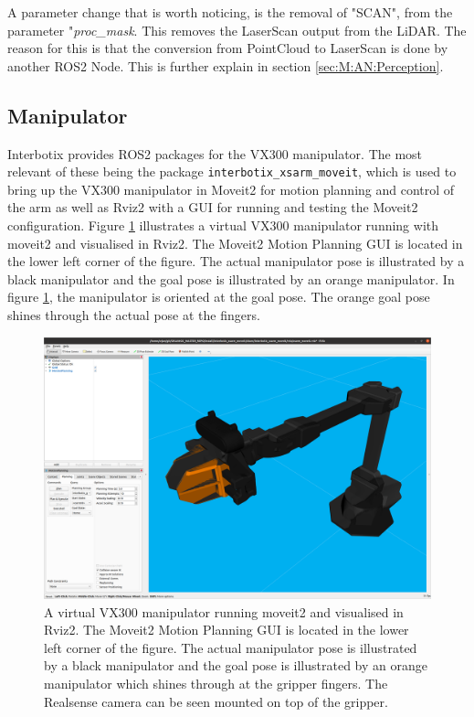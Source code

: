

A parameter change that is worth noticing, is the removal of "SCAN", from the parameter "\textit{proc\_mask}. This removes the LaserScan output from the LiDAR. The reason for this is that the conversion from PointCloud to LaserScan is done by another ROS2 Node. This is further explain in section \ref{sec:M:AN:Perception}.

\subsection{Manipulator}\label{sec:M:MRC:Manipulator}
Interbotix provides ROS2 packages for the VX300 manipulator. The most relevant of these being the package \lstinline{interbotix_xsarm_moveit}, which is used to bring up the VX300 manipulator in Moveit2 for motion planning and control of the arm as well as Rviz2 with a GUI for running and testing the Moveit2 configuration. Figure \ref{fig:VX300Moveit} illustrates a virtual VX300 manipulator running with moveit2 and visualised in Rviz2. The Moveit2 Motion Planning GUI is located in the lower left corner of the figure. The actual manipulator pose is illustrated by a black manipulator and the goal pose is illustrated by an orange manipulator. In figure \ref{fig:VX300Moveit}, the manipulator is oriented at the goal pose. The orange goal pose shines through the actual pose at the fingers.

\begin{figure}[htp]
  \centering
  \includegraphics[width = 1\textwidth]{Figures/figVX300Moveit.png}
  \caption{A virtual VX300 manipulator running moveit2 and visualised in Rviz2. The Moveit2 Motion Planning GUI is located in the lower left corner of the figure. The actual manipulator pose is illustrated by a black manipulator and the goal pose is illustrated by an orange manipulator which shines through at the gripper fingers. The Realsense camera can be seen mounted on top of the gripper.}
  \label{fig:VX300Moveit}
\end{figure}

